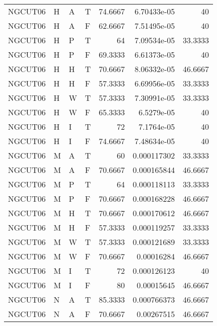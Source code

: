 \begin{longtable}{llllrrr}
    NGCUT06  & H     & A     & T          & 74.6667    & 6.70433e-05 & 40       \\
    NGCUT06  & H     & A     & F          & 62.6667    & 7.51495e-05 & 40       \\
    NGCUT06  & H     & P     & T          & 64         & 7.09534e-05 & 33.3333  \\
    NGCUT06  & H     & P     & F          & 69.3333    & 6.61373e-05 & 40       \\
    NGCUT06  & H     & H     & T          & 70.6667    & 8.06332e-05 & 46.6667  \\
    NGCUT06  & H     & H     & F          & 57.3333    & 6.69956e-05 & 33.3333  \\
    NGCUT06  & H     & W     & T          & 57.3333    & 7.30991e-05 & 33.3333  \\
    NGCUT06  & H     & W     & F          & 65.3333    & 6.5279e-05  & 40       \\
    NGCUT06  & H     & I     & T          & 72         & 7.1764e-05  & 40       \\
    NGCUT06  & H     & I     & F          & 74.6667    & 7.48634e-05 & 40       \\
    NGCUT06  & M     & A     & T          & 60         & 0.000117302 & 33.3333  \\
    NGCUT06  & M     & A     & F          & 70.6667    & 0.000165844 & 46.6667  \\
    NGCUT06  & M     & P     & T          & 64         & 0.000118113 & 33.3333  \\
    NGCUT06  & M     & P     & F          & 70.6667    & 0.000168228 & 46.6667  \\
    NGCUT06  & M     & H     & T          & 70.6667    & 0.000170612 & 46.6667  \\
    NGCUT06  & M     & H     & F          & 57.3333    & 0.000119257 & 33.3333  \\
    NGCUT06  & M     & W     & T          & 57.3333    & 0.000121689 & 33.3333  \\
    NGCUT06  & M     & W     & F          & 70.6667    & 0.00016284  & 46.6667  \\
    NGCUT06  & M     & I     & T          & 72         & 0.000126123 & 40       \\
    NGCUT06  & M     & I     & F          & 80         & 0.00015645  & 46.6667  \\
    NGCUT06  & N     & A     & T          & 85.3333    & 0.000766373 & 46.6667  \\
    NGCUT06  & N     & A     & F          & 70.6667    & 0.00267515  & 46.6667  \\

\end{longtable}
